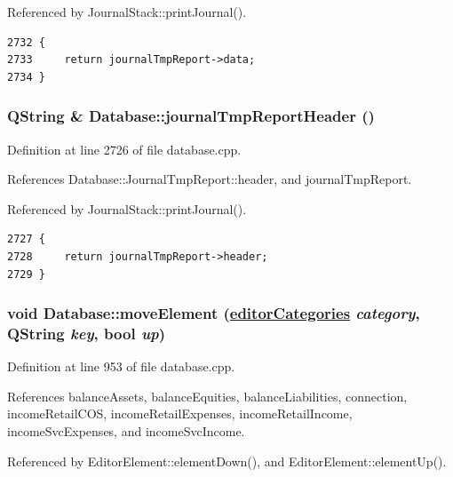 Referenced by Journal\-Stack::print\-Journal().

\footnotesize\begin{verbatim}2732 {
2733     return journalTmpReport->data;
2734 }
\end{verbatim}\normalsize 


\hypertarget{classDatabase_a34}{
\subsubsection[journalTmpReportHeader]{\setlength{\rightskip}{0pt plus 5cm}QString \& Database::journal\-Tmp\-Report\-Header ()}}
\label{classDatabase_a34}


Definition at line 2726 of file database.cpp.

References Database::Journal\-Tmp\-Report::header, and journal\-Tmp\-Report.

Referenced by Journal\-Stack::print\-Journal().

\footnotesize\begin{verbatim}2727 {
2728     return journalTmpReport->header;
2729 }
\end{verbatim}\normalsize 


\hypertarget{classDatabase_a21}{
\subsubsection[moveElement]{\setlength{\rightskip}{0pt plus 5cm}void Database::move\-Element (\hyperlink{classDatabase_w8}{editor\-Categories} {\em category}, QString {\em key}, bool {\em up})}}
\label{classDatabase_a21}


Definition at line 953 of file database.cpp.

References balance\-Assets, balance\-Equities, balance\-Liabilities, connection, income\-Retail\-COS, income\-Retail\-Expenses, income\-Retail\-Income, income\-Svc\-Expenses, and income\-Svc\-Income.

Referenced by Editor\-Element::element\-Down(), and Editor\-Element::element\-Up().

